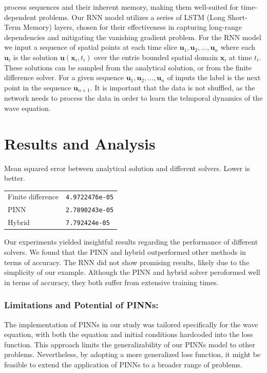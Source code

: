 \documentclass[twoside,11pt]{report}
\begin{document}
    process sequences and their inherent memory, making them well-suited for time-dependent problems.
    Our RNN model utilizes a series of LSTM (Long Short-Term Memory)\cite{lstm} layers, chosen for their 
    effectiveness in capturing long-range dependencies and mitigating the vanishing gradient problem.
    For the RNN model we input a sequence of spatial points at each time slice 
    $\mathbf{u}_1, \mathbf{u}_2, \dots, \mathbf{u}_n$ where each $\mathbf{u}_i$ is 
    the solution $\mathbf{u}(\mathbf{x}_i,t_i)$
    over the entrie bounded spatial domain $\mathbf{x}_i$ at time $t_i$. These solutions can be sampled from the analytical
    solution, or from the finite difference solver.
    For a given sequence $\mathbf{u}_1, \mathbf{u}_2, \dots, \mathbf{u}_n$ of inputs the 
    label is the next point in the sequence
    $\mathbf{u}_{n+1}$.
    It is important that the data is not shuffled, as the network needs to process the data in order to learn the
    telmporal dynamics of the wave equation.
        \cite{hu2022neuralpde}



\section{Results and Analysis}
\label{sec:resultsdiscussion}

    \begin{mytable}[float=!h,label=tab:toyscores, width=0.5\textwidth]{Mean squared error between 
        analytical solution and different solvers. Lower is better.}
    \centering
    \begin{tabular}{l|l}
        Finite difference   &\texttt{4.9722476e-05}  \\
        PINN                &\texttt{2.7890243e-05}  \\
        Hybrid              &\texttt{7.792424e-05}  \\
    \end{tabular}%
    \end{mytable}
    
    Our experiments yielded insightful results regarding the performance of different solvers. 
    We found that the PINN and hybrid outperformed other methods in terms of accuracy. The RNN did 
    not show promising results, likely due to the simplicity of our example.
    Although the PINN and hybrid solver peroformed well in terms of accuracy, they both suffer from extensive
    training times.
    \subsubsection{Limitations and Potential of PINNs:}
    The implementation of PINNs in our study was tailored specifically for the wave equation, with both the 
    equation and initial conditions hardcoded into the loss function. This approach limits the generalizability 
    of our PINNs model to other problems. Nevertheless, by adopting a more generalized loss function, it might 
    be feasible to extend the application of PINNs to a broader range of problems.
\end{document}
